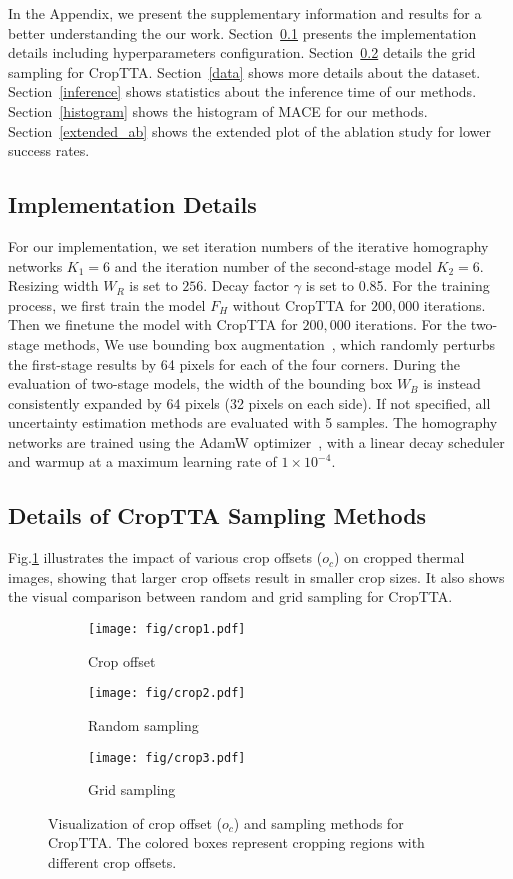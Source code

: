 In the Appendix, we present the supplementary information and results for a better understanding the our work. Section~\ref{imp} presents the implementation details including hyperparameters configuration. Section~\ref{grid} details the grid sampling for CropTTA. Section~\ref{data} shows more details about the dataset. Section~\ref{inference} shows statistics about the inference time of our methods. Section~\ref{histogram} shows the histogram of MACE for our methods. Section~\ref{extended_ab} shows the extended plot of the ablation study for lower success rates.

\subsection{Implementation Details}\label{imp}
For our implementation, we set iteration numbers of the iterative homography networks $K_1=6$ and the iteration number of the second-stage model $K_2=6$. Resizing width $W_R$ is set to $256$. Decay factor $\gamma$ is set to 0.85. For the training process, we first train the model $F_H$ without CropTTA for $200,000$ iterations. Then we finetune the model with CropTTA for $200,000$ iterations. For the two-stage methods, We use bounding box augmentation~\cite{STHN}, which randomly perturbs the first-stage results by 64 pixels for each of the four corners. During the evaluation of two-stage models, the width of the bounding box $W_B$ is instead consistently expanded by 64 pixels (32 pixels on each side). If not specified, all uncertainty estimation methods are evaluated with 5 samples. The homography networks are trained using the AdamW optimizer~\cite{loshchilov2017decoupled}, with a linear decay scheduler and warmup at a maximum learning rate of $1\times10^{-4}$.

\subsection{Details of CropTTA Sampling Methods}\label{grid}
Fig.\ref{croptta_method} illustrates the impact of various crop offsets ($o_c$) on cropped thermal images, showing that larger crop offsets result in smaller crop sizes. It also shows the visual comparison between random and grid sampling for CropTTA.
\begin{figure}[!htb]
\begin{subfigure}[b]{0.33\textwidth}
    \texttt{[image: fig/crop1.pdf]}
    \caption{Crop offset}
\end{subfigure}
\begin{subfigure}[b]{0.33\textwidth}
\texttt{[image: fig/crop2.pdf]}
    \caption{Random sampling}
\end{subfigure}
\begin{subfigure}[b]{0.33\textwidth}
\texttt{[image: fig/crop3.pdf]}
    \caption{Grid sampling}
\end{subfigure}
    \caption{Visualization of crop offset ($o_c$) and sampling methods for CropTTA. The colored boxes represent cropping regions with different crop offsets.}
    \label{croptta_method}
    \vspace{-15pt}
\end{figure}


